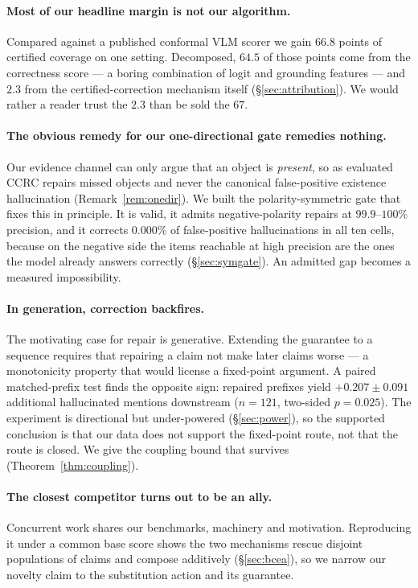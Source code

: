 \documentclass{article}
\theoremstyle{plain}
\theoremstyle{definition}
\theoremstyle{remark}
\begin{document}
\paragraph{Most of our headline margin is not our algorithm.}
Compared against a published conformal VLM scorer we gain $66.8$ points of certified coverage
on one setting. Decomposed, $64.5$ of those points come from the correctness score --- a boring
combination of logit and grounding features --- and $2.3$ from the certified-correction
mechanism itself (\S\ref{sec:attribution}). We would rather a reader trust the $2.3$ than be
sold the $67$.

\paragraph{The obvious remedy for our one-directional gate remedies nothing.}
Our evidence channel can only argue that an object is \emph{present}, so as evaluated CCRC
repairs missed objects and never the canonical false-positive existence hallucination
(Remark~\ref{rem:onedir}). We built the polarity-symmetric gate that fixes this in principle.
It is valid, it admits negative-polarity repairs at $99.9$--$100\%$ precision, and it corrects
$0.000\%$ of false-positive hallucinations in all ten cells, because on the negative side the
items reachable at high precision are the ones the model already answers correctly
(\S\ref{sec:symgate}). An admitted gap becomes a measured impossibility.

\paragraph{In generation, correction backfires.}
The motivating case for repair is generative. Extending the guarantee to a sequence requires
that repairing a claim not make later claims worse --- a monotonicity property that would
license a fixed-point argument. A paired matched-prefix test finds the opposite sign:
repaired prefixes yield $+0.207\pm0.091$ additional hallucinated mentions downstream
($n=121$, two-sided $p=0.025$). The experiment is directional but under-powered
(\S\ref{sec:power}), so the supported conclusion is that our data does not support the
fixed-point route, not that the route is closed. We give the coupling bound that survives
(Theorem~\ref{thm:coupling}).

\paragraph{The closest competitor turns out to be an ally.}
Concurrent work \citep{bcea} shares our benchmarks, machinery and motivation. Reproducing it
under a common base score shows the two mechanisms rescue disjoint populations of claims and
compose additively (\S\ref{sec:bcea}), so we narrow our novelty claim to the substitution
action and its guarantee.
\end{document}

